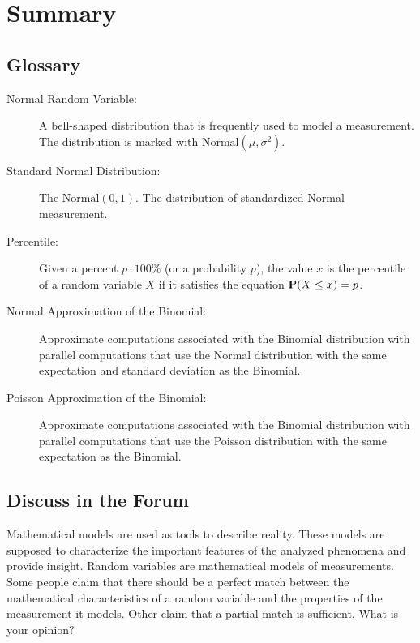 \documentclass[]{krantz}
\newcommand{\Prob}{{\rm I\kern-.3em P}}
\theoremstyle{definition}
\theoremstyle{definition}
\theoremstyle{definition}
\theoremstyle{remark}
\begin{document}
\hypertarget{summary-5}{%
\section{Summary}\label{summary-5}}

\hypertarget{glossary}{%
\subsection*{Glossary}\label{glossary}}


\begin{description}
\item[Normal Random Variable:]
A bell-shaped distribution that is frequently used to model a
measurement. The distribution is marked with
\(\mathrm{Normal}(\mu,\sigma^2)\).
\item[Standard Normal Distribution:]
The \(\mathrm{Normal}(0,1)\). The distribution of standardized Normal
measurement.
\item[Percentile:]
Given a percent \(p \cdot 100\%\) (or a probability \(p\)), the value
\(x\) is the percentile of a random variable \(X\) if it satisfies the
equation \(\Prob(X \leq x) = p\).
\item[Normal Approximation of the Binomial:]
Approximate computations associated with the Binomial distribution
with parallel computations that use the Normal distribution with the
same expectation and standard deviation as the Binomial.
\item[Poisson Approximation of the Binomial:]
Approximate computations associated with the Binomial distribution
with parallel computations that use the Poisson distribution with
the same expectation as the Binomial.
\end{description}

\hypertarget{discuss-in-the-forum}{%
\subsection*{Discuss in the Forum}\label{discuss-in-the-forum}}


Mathematical models are used as tools to describe reality. These models
are supposed to characterize the important features of the analyzed
phenomena and provide insight. Random variables are mathematical models
of measurements. Some people claim that there should be a perfect match
between the mathematical characteristics of a random variable and the
properties of the measurement it models. Other claim that a partial
match is sufficient. What is your opinion?
\end{document}
